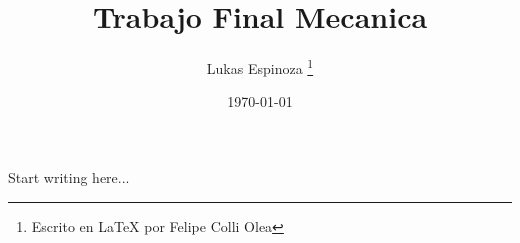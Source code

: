 \documentclass[11pt]{article}
\title{Trabajo Final Mecanica}
\author{Lukas Espinoza \thanks{Escrito en LaTeX por Felipe Colli Olea}}
\date{\today}
\begin{document}
\maketitle

Start writing here...
\end{document}
